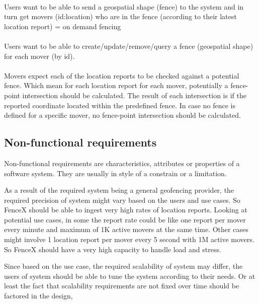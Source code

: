 \documentclass[a4]{report}
\begin{document}
    \paragraph{}
    Users want to be able to send a geospatial shape (fence) to the system and in turn get movers (id:location) who
    are in the fence (according to their latest location report) = on demand fencing

    \paragraph{}
    Users want to be able to create/update/remove/query a fence (geospatial shape) for each mover (by id).

    \paragraph{}
    Movers expect each of the location reports to be checked against a potential fence.
    Which mean for each location report for each mover, potentially a fence-point intersection should be calculated.
    The result of each intersection is if the reported coordinate located within the predefined fence.
    In case no fence is defined for a specific mover, no fence-point intersection should be calculated.

    \subsection{Non-functional requirements}
    Non-functional requirements are characteristics, attributes or properties of a software system.
    They are usually in style of a constrain or a limitation.

    As a result of the required system being a general geofencing provider, the required precision of system might vary
    based on the users and use cases.
    So FenceX should be able to ingest very high rates of location reports.
    Looking at potential use cases, in some the report rate could be like one report per mover every minute and
    maximum of 1K active movers at the same time.
    Other cases might involve 1 location report per mover every 5 second with 1M active movers.
    So FenceX should have a very high capacity to handle load and stress.

    Since based on the use case, the required scalability of system may differ, the users of system should be able to
    tune the system according to their needs.
    Or at least the fact that scalability requirements are not fixed over time should be factored in the design,
\end{document}
